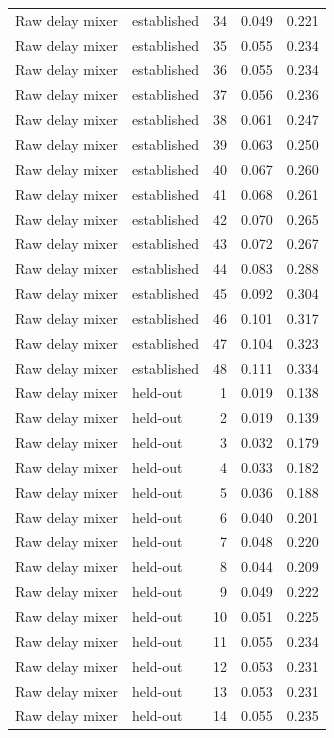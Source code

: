 \begin{tabular}{llrrr}
Raw delay mixer & established & 34 & 0.049 & 0.221 \\
Raw delay mixer & established & 35 & 0.055 & 0.234 \\
Raw delay mixer & established & 36 & 0.055 & 0.234 \\
Raw delay mixer & established & 37 & 0.056 & 0.236 \\
Raw delay mixer & established & 38 & 0.061 & 0.247 \\
Raw delay mixer & established & 39 & 0.063 & 0.250 \\
Raw delay mixer & established & 40 & 0.067 & 0.260 \\
Raw delay mixer & established & 41 & 0.068 & 0.261 \\
Raw delay mixer & established & 42 & 0.070 & 0.265 \\
Raw delay mixer & established & 43 & 0.072 & 0.267 \\
Raw delay mixer & established & 44 & 0.083 & 0.288 \\
Raw delay mixer & established & 45 & 0.092 & 0.304 \\
Raw delay mixer & established & 46 & 0.101 & 0.317 \\
Raw delay mixer & established & 47 & 0.104 & 0.323 \\
Raw delay mixer & established & 48 & 0.111 & 0.334 \\
Raw delay mixer & held-out & 1 & 0.019 & 0.138 \\
Raw delay mixer & held-out & 2 & 0.019 & 0.139 \\
Raw delay mixer & held-out & 3 & 0.032 & 0.179 \\
Raw delay mixer & held-out & 4 & 0.033 & 0.182 \\
Raw delay mixer & held-out & 5 & 0.036 & 0.188 \\
Raw delay mixer & held-out & 6 & 0.040 & 0.201 \\
Raw delay mixer & held-out & 7 & 0.048 & 0.220 \\
Raw delay mixer & held-out & 8 & 0.044 & 0.209 \\
Raw delay mixer & held-out & 9 & 0.049 & 0.222 \\
Raw delay mixer & held-out & 10 & 0.051 & 0.225 \\
Raw delay mixer & held-out & 11 & 0.055 & 0.234 \\
Raw delay mixer & held-out & 12 & 0.053 & 0.231 \\
Raw delay mixer & held-out & 13 & 0.053 & 0.231 \\
Raw delay mixer & held-out & 14 & 0.055 & 0.235 \\

\end{tabular}
